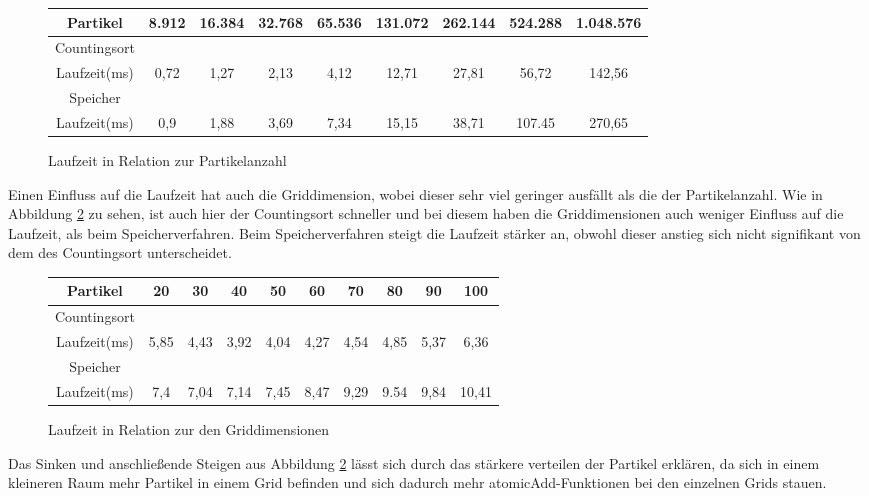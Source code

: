 \documentclass[intern,palatino]{cgBA}
\begin{document}
\begin{figure}[H]
	\centering
	\begin{tabular}{ | c || c | c | c | c | c | c | c | c |}
		\hline
		Partikel			&  8.912 & 16.384 & 32.768 & 65.536 & 131.072 & 262.144 & 524.288 & 1.048.576	\\ \hline
		Countingsort														\\ \hline
		Laufzeit(ms)		&   0,72 &  1,27 &  2,13 &  4,12 &  12,71 &  27,81 &  56,72 &  142,56		 	\\ \hline
		
		Speicher															\\ \hline
		Laufzeit(ms)		&   0,9 &  1,88 &  3,69 &  7,34 &  15,15 &  38,71 &  107.45 &  270,65	\\
		\hline
	\end{tabular}
	\caption{Laufzeit in Relation zur Partikelanzahl}
	\label{tab:particle}
\end{figure}

Einen Einfluss auf die Laufzeit hat auch die Griddimension, wobei dieser sehr viel geringer ausfällt als die der Partikelanzahl. Wie in Abbildung \ref{tab:Grid} zu sehen, ist auch hier der Countingsort schneller und bei diesem haben die Griddimensionen auch weniger Einfluss auf die Laufzeit, als beim Speicherverfahren. Beim Speicherverfahren steigt die Laufzeit stärker an, obwohl dieser anstieg sich nicht signifikant von dem des Countingsort unterscheidet.
\newline

\begin{figure}[H]
	\centering
	\begin{tabular}{ | c || c | c | c | c | c | c | c | c | c |}
		\hline
		Partikel			&  20 & 30 & 40 & 50 & 60 & 70 & 80 & 90 & 100	\\ \hline
		Countingsort														\\ \hline
		Laufzeit(ms)		&   5,85 &  4,43 &  3,92 &  4,04 &  4,27 &  4,54 &  4,85 &  5,37 &	6,36	 	\\ \hline
		
		Speicher															\\ \hline
		Laufzeit(ms)		&   7,4 &  7,04 &  7,14 &  7,45 &  8,47 &  9,29 &  9.54 &  9,84 & 10,41	\\
		\hline
	\end{tabular}
	\caption{Laufzeit in Relation zur den Griddimensionen}
	\label{tab:Grid}
\end{figure}

Das Sinken und anschließende Steigen aus Abbildung \ref{tab:Grid} lässt sich durch das stärkere verteilen der Partikel erklären, da sich in einem kleineren Raum mehr Partikel in einem Grid befinden und sich dadurch mehr atomicAdd-Funktionen bei den einzelnen Grids stauen.
\end{document}
